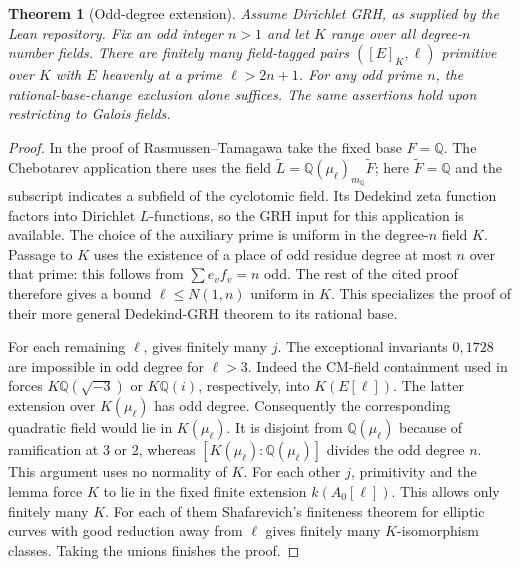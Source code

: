 \documentclass[11pt]{article}
\newtheorem{theorem}{Theorem}
\begin{document}
\begin{theorem}[Odd-degree extension]
Assume Dirichlet GRH, as supplied by the Lean repository. Fix an odd integer
$n>1$ and let $K$ range over all degree-$n$ number fields. There are finitely
many field-tagged pairs $([E]_K,\ell)$ primitive over $K$ with $E$ heavenly
at a prime $\ell>2n+1$. For any odd prime $n$, the rational-base-change
exclusion alone suffices. The same assertions hold upon restricting to
Galois fields.
\end{theorem}
\begin{proof}
In the proof of Rasmussen--Tamagawa \cite[Theorem 5.3]{rt} take the fixed
base $F=\mathbb Q$. The Chebotarev application there uses the field
$\widetilde L=\mathbb Q(\mu_\ell)_{m_{\mathbb Q}}\widetilde F$; here
$\widetilde F=\mathbb Q$ and the subscript indicates a subfield of the
cyclotomic field. Its Dedekind zeta function factors into Dirichlet
$L$-functions, so the GRH input for this application is available. The choice
of the auxiliary prime is uniform in the degree-$n$ field $K$. Passage to
$K$ uses the existence of a place of odd residue degree at most $n$ over that
prime: this follows from $\sum e_vf_v=n$ odd. The rest of the cited proof
therefore gives a bound $\ell\le N(1,n)$ uniform in $K$. This specializes
the proof of their more general Dedekind-GRH theorem to its rational base.

For each remaining $\ell$, \cite[Theorem 3.1]{mr} gives finitely many $j$.
The exceptional invariants $0,1728$ are impossible in odd degree for
$\ell>3$. Indeed the CM-field containment used in
\cite[Lemma 5.1]{ohara} forces $K\mathbb Q(\sqrt{-3})$ or
$K\mathbb Q(i)$, respectively, into $K(E[\ell])$. The latter extension
over $K(\mu_\ell)$ has odd degree. Consequently the corresponding quadratic
field would lie in $K(\mu_\ell)$. It is disjoint from $\mathbb Q(\mu_\ell)$
because of ramification at $3$ or $2$, whereas
$[K(\mu_\ell):\mathbb Q(\mu_\ell)]$ divides the odd degree $n$. This argument
uses no normality of $K$. For each other $j$, primitivity and the lemma force
$K$ to lie in the fixed finite extension $k(A_0[\ell])$. This allows only
finitely many $K$. For each of them Shafarevich's finiteness theorem for
elliptic curves with good reduction away from $\ell$ gives finitely many
$K$-isomorphism classes. Taking the unions finishes the proof.
\end{proof}
\end{document}
